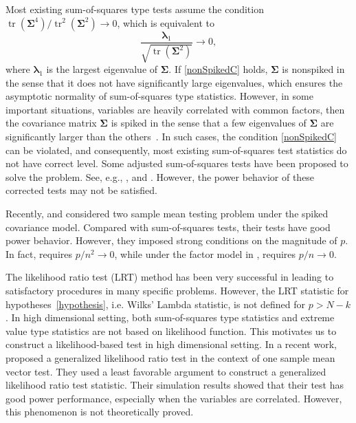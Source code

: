 \documentclass[12pt]{article} %
\DeclareMathOperator{\mytr}{tr}
\newcommand{\bfsym}[1]{\ensuremath{\boldsymbol{#1}}}
\def\blambda {\bfsym {\lambda}}
\def\bSigma {\bfsym {\Sigma}}
\theoremstyle{definition}
\begin{document}
Most existing sum-of-squares type tests assume the condition 
$\mytr(\bSigma^4)/\mytr^2(\bSigma^2)\to 0$, which is equivalent to
\begin{equation}\label{nonSpikedC}
    \frac{\blambda_1}{\sqrt{\mytr(\bSigma^2)}}\to 0,
\end{equation}
where $\blambda_1$ is the largest eigenvalue of $\bSigma$.
If \eqref{nonSpikedC} holds, $\bSigma$ is nonspiked in the sense that it does not have significantly large eigenvalues, which ensures the asymptotic normality of sum-of-squares type statistics.
However, in some important situations, variables are heavily correlated with common factors, then the covariance matrix $\bSigma$ is spiked in the sense that a few eigenvalues of $\bSigma$ are significantly larger than the others~\citep{Fan2008High,Cai2012Sparse,Shen2013Consistency,Ma2015A}.
In such cases, the condition \eqref{nonSpikedC} can be violated, and consequently, most existing sum-of-squares test statistics do not have correct level.
Some adjusted sum-of-squares tests have been proposed to solve the problem.
See, e.g., \cite{Ma2015A}, \cite{ZHANG2017200} and \cite{WANG2018}.
However, the power behavior of these corrected tests may not be satisfied.


Recently, \cite{Aoshima2018} and \cite{WANG2018225} considered two sample mean testing problem under the spiked covariance model.
Compared with sum-of-squares tests, their tests have good power behavior.
However, they imposed strong conditions on the magnitude of $p$.
In fact, \cite{WANG2018225} requires $p/n^2\to 0$, while under the factor model in \cite{Ma2015A}, \cite{Aoshima2018} requires $p/n \to 0$.

   The likelihood ratio test (LRT) method has been very successful in leading to satisfactory procedures in many specific problems.
    However, the LRT statistic for hypotheses~\eqref{hypothesis}, i.e. Wilks' Lambda statistic, is not defined for $p>N-k$.
   In high dimensional setting, both sum-of-squares type statistics and extreme value type statistics are not based on likelihood function.
    This motivates us to construct a likelihood-based test in high dimensional setting.
    In a recent work,~\cite{Zhao2016A} proposed a generalized likelihood ratio test in the context of one sample mean vector test.
    They used a least favorable argument to construct a generalized likelihood ratio test statistic.
    Their simulation results showed that their test has good power performance, especially when the variables are correlated.
    However, this phenomenon is not theoretically proved.
\end{document}
